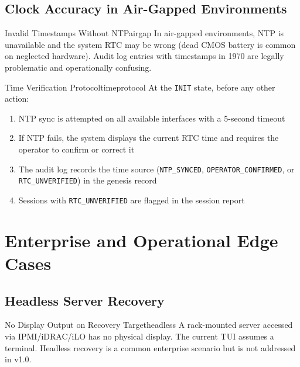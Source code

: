 \documentclass[11pt,a4paper]{report}
\begin{document}
\section{Clock Accuracy in Air-Gapped Environments}

\begin{edgecase}{Invalid Timestamps Without NTP}{airgap}
In air-gapped environments, NTP is unavailable and the system RTC may be wrong (dead CMOS battery is common on neglected hardware). Audit log entries with timestamps in 1970 are legally problematic and operationally confusing.
\end{edgecase}

\begin{solution}{Time Verification Protocol}{timeprotocol}
At the \texttt{INIT} state, before any other action:
\begin{enumerate}[noitemsep]
  \item NTP sync is attempted on all available interfaces with a 5-second timeout
  \item If NTP fails, the system displays the current RTC time and requires the operator to confirm or correct it
  \item The audit log records the time source (\texttt{NTP\_SYNCED}, \texttt{OPERATOR\_CONFIRMED}, or \texttt{RTC\_UNVERIFIED}) in the genesis record
  \item Sessions with \texttt{RTC\_UNVERIFIED} are flagged in the session report
\end{enumerate}
\end{solution}

\chapter{Enterprise and Operational Edge Cases}

\section{Headless Server Recovery}

\begin{edgecase}{No Display Output on Recovery Target}{headless}
A rack-mounted server accessed via IPMI/iDRAC/iLO has no physical display. The current TUI assumes a terminal. Headless recovery is a common enterprise scenario but is not addressed in v1.0.
\end{edgecase}
\end{document}
